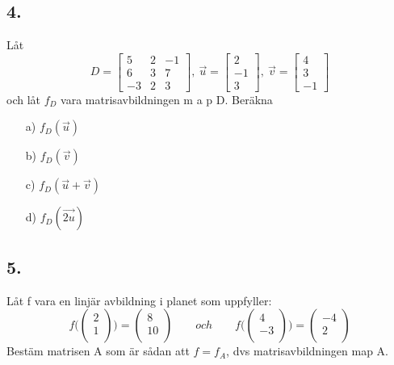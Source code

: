 \documentclass{article}
\begin{document}
\subsection*{4.}
Låt 
\[
	D = 
    \begin{bmatrix}
    5	&	2	&	-1	\\
    6	&	3	&	7	\\
    -3	&	2	&	3
    \end{bmatrix}  
    ,\>
    \vec{u} =
    \begin{bmatrix}
    2   	\\
   	-1 		\\
   	3		
   	\end{bmatrix}
   	,\>
    \vec{v} =
    \begin{bmatrix}
    4   	\\
   	3 		\\
   	-1		
   	\end{bmatrix}
\]
och låt $f_D$ vara matrisavbildningen m a p D. Beräkna
\begin{itemize}
	\item[a) ]	$f_{D}(\vec{u})$
	\item[b) ]	$f_{D}(\vec{v})$
	\item[c) ]	$f_{D}(\vec{u} + \vec{v})$
	\item[d) ]	$f_{D}(\vec{2u})$
\end{itemize}

\subsection*{5.}
Låt f vara en linjär avbildning i planet som uppfyller:
\[
	f \bigg (  
    \begin{pmatrix}
    2		\\
    1		\\
    \end{pmatrix}  
	\bigg )   
	= 
	\begin{pmatrix}
    8		\\
    10		\\
    \end{pmatrix}    
    \qquad 
	och
	\qquad
    f \bigg (  
    \begin{pmatrix}
    4		\\
    -3		\\
    \end{pmatrix}  
	\bigg )   
	= 
	\begin{pmatrix}
    -4		\\
    2		\\
    \end{pmatrix}   	
\]
Bestäm matrisen A som är sådan att $f = f_A$, dvs matrisavbildningen map A.
\end{document}
